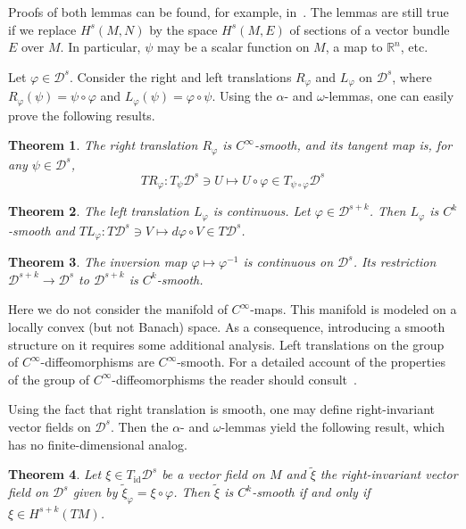 \documentclass[a5paper,10pt,twoside]{article}
\newcommand{\R}{\ensuremath{\mathbb{R}}}
\newcommand{\cD}{\ensuremath{\mathcal{D}}}
\DeclareMathOperator*{\id}{id}
\theoremstyle{plain}
\newtheorem{teo}{Theorem}[section]
\theoremstyle{definition}
\theoremstyle{remark}
\begin{document}
Proofs of both lemmas can be found, for example, in~\cite{marsden1970}. The lemmas
are still true if we replace $H^s(M,N)$ by the space $H^s(M,E)$ of sections of a
vector bundle $E$ over $M$. In particular, $\psi$ may be a scalar
function on $M$, a map to $\R^n$, etc.

Let $\varphi\in\cD^s$. Consider the right and left translations $R_\varphi$ and $L_\varphi$ on $\cD^s$, where $R_\varphi(\psi) = \psi\circ\varphi$ and $L_\varphi(\psi) = \varphi\circ\psi$. Using the $\alpha$- and $\omega$-lemmas, one can easily prove the following results.

\begin{teo}
The right translation $R_\varphi$ is $C^\infty$-smooth, and its tangent map is, for any $\psi\in \cD^s$,
\[
TR_\varphi: T_\psi\cD^s\ni U\mapsto U\circ \varphi\in T_{\psi\circ\varphi}\cD^s
\]
\end{teo}

\begin{teo}
The left translation $L_\varphi$ is continuous. Let $\varphi\in \cD^{s+k}$. Then $L_\varphi$ is $C^k$-smooth and $TL_\varphi:T\cD^s\ni V\mapsto d\varphi\circ V\in T\cD^{s}$.
\end{teo}

\begin{teo}
	\label{teo:inversion}
The inversion map $\varphi\mapsto \varphi^{-1}$ is continuous on $\cD^s$. Its restriction  $\cD^{s+k}\to\cD^s$ to $\cD^{s+k}$ is $C^k$-smooth.
\end{teo}

Here we do not consider the manifold of $C^\infty$-maps. This
manifold is modeled on a locally convex (but not Banach) space. As a consequence,
introducing a smooth structure on it requires some additional analysis.
Left translations on the group of $C^\infty$-diffeomorphisms are $C^\infty$-smooth.
For a detailed account of the properties of the group of $C^\infty$-diffeomorphisms the reader should consult~\cite{ebin1970groups}.

Using the fact that right translation is smooth, one may define right-invariant
vector fields on $\cD^s$. Then the $\alpha$- and $\omega$-lemmas yield the following result, which has no finite-dimensional analog.

\begin{teo}
Let $\xi\in T_{\id}\cD^s$ be a vector field on $M$ and $\tilde{\xi}$ the right-invariant
vector field on $\cD^s$ given by $\tilde{\xi}_\varphi = \xi\circ\varphi$. Then $\tilde{\xi}$ is $C^k$-smooth if and only if $\xi\in H^{s+k}(TM)$.
\end{teo}
\end{document}
